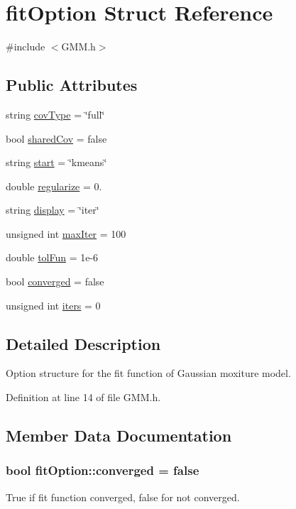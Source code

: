 \hypertarget{structfit_option}{\section{fit\+Option Struct Reference}
\label{structfit_option}
}


{\ttfamily \#include $<$G\+M\+M.\+h$>$}

\subsection*{Public Attributes}
\begin{DoxyCompactItemize}
\item 
string \hyperlink{structfit_option_ae1d880f6fcd26e15f07d50c77c5cceea}{cov\+Type} = \char`\"{}full\char`\"{}
\item 
bool \hyperlink{structfit_option_a2efaf3629539e3864967853058e80420}{shared\+Cov} = false
\item 
string \hyperlink{structfit_option_a4c1ecd5ba984e2e12faa29217c78f931}{start} = \char`\"{}kmeans\char`\"{}
\item 
double \hyperlink{structfit_option_abffa02537679becf07413b31f5889e6f}{regularize} = 0.
\item 
string \hyperlink{structfit_option_acd949efbbb51ddf447d4cb86fd2ac901}{display} = \char`\"{}iter\char`\"{}
\item 
unsigned int \hyperlink{structfit_option_a54d1906ece53c348047c8b404ff06053}{max\+Iter} = 100
\item 
double \hyperlink{structfit_option_a4523efadc5bc4f29cd1648ac4ca018dd}{tol\+Fun} = 1e-\/6
\item 
bool \hyperlink{structfit_option_a600d82e88e845abb5a442f80eecf89cb}{converged} = false
\item 
unsigned int \hyperlink{structfit_option_a711048d488fccee5740b31e4149c46de}{iters} = 0
\end{DoxyCompactItemize}


\subsection{Detailed Description}
Option structure for the fit function of Gaussian moxiture model. 

Definition at line 14 of file G\+M\+M.\+h.



\subsection{Member Data Documentation}
\hypertarget{structfit_option_a600d82e88e845abb5a442f80eecf89cb}{
\subsubsection[{converged}]{\setlength{\rightskip}{0pt plus 5cm}bool fit\+Option\+::converged = false}}\label{structfit_option_a600d82e88e845abb5a442f80eecf89cb}
True if fit function converged, false for not converged. 

